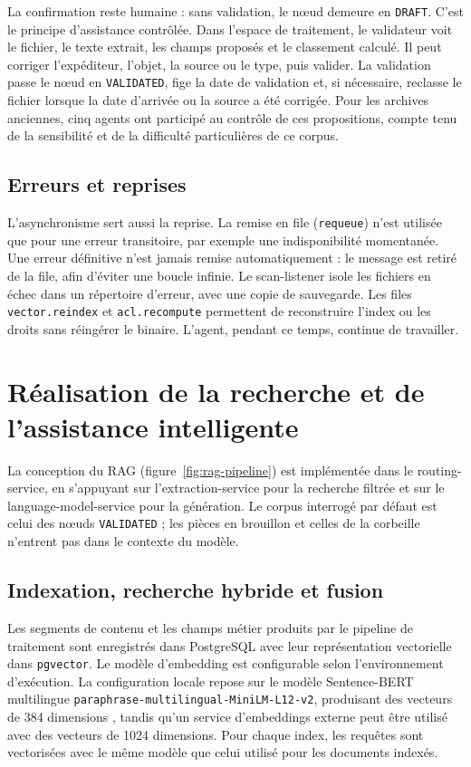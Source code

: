 La confirmation reste humaine : sans validation, le nœud demeure en \texttt{DRAFT}. C'est le principe d'assistance contrôlée. Dans l'espace de traitement, le validateur voit le fichier, le texte extrait, les champs proposés et le classement calculé. Il peut corriger l'expéditeur, l'objet, la source ou le type, puis valider. La validation passe le nœud en \texttt{VALIDATED}, fige la date de validation et, si nécessaire, reclasse le fichier lorsque la date d'arrivée ou la source a été corrigée. Pour les archives anciennes, cinq agents ont participé au contrôle de ces propositions, compte tenu de la sensibilité et de la difficulté particulières de ce corpus.

\subsection{Erreurs et reprises}

L'asynchronisme sert aussi la reprise. La remise en file (\texttt{requeue}) n'est utilisée que pour une erreur transitoire, par exemple une indisponibilité momentanée. Une erreur définitive n'est jamais remise automatiquement : le message est retiré de la file, afin d'éviter une boucle infinie. Le scan-listener isole les fichiers en échec dans un répertoire d'erreur, avec une copie de sauvegarde. Les files \texttt{vector.reindex} et \texttt{acl.recompute} permettent de reconstruire l'index ou les droits sans réingérer le binaire. L'agent, pendant ce temps, continue de travailler.

\section{Réalisation de la recherche et de l'assistance intelligente}

La conception du RAG (figure~\ref{fig:rag-pipeline}) est implémentée dans le routing-service, en s'appuyant sur l'extraction-service pour la recherche filtrée et sur le language-model-service pour la génération. Le corpus interrogé par défaut est celui des nœuds \texttt{VALIDATED} ; les pièces en brouillon et celles de la corbeille n'entrent pas dans le contexte du modèle.

\subsection{Indexation, recherche hybride et fusion}

Les segments de contenu et les champs métier produits par le pipeline de traitement sont enregistrés dans PostgreSQL avec leur représentation vectorielle dans \texttt{pgvector}. Le modèle d'embedding est configurable selon l'environnement d'exécution. La configuration locale repose sur le modèle Sentence-BERT multilingue \texttt{paraphrase-multilingual-MiniLM-L12-v2}, produisant des vecteurs de 384 dimensions , tandis qu'un service d'embeddings externe peut être utilisé avec des vecteurs de 1024 dimensions. Pour chaque index, les requêtes sont vectorisées avec le même modèle que celui utilisé pour les documents indexés.

